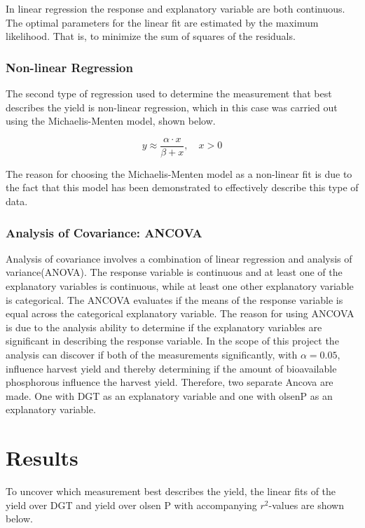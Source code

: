 \documentclass[11pt, fleqn, titlepage]{article}
\begin{document}
\noindent
In linear regression the response and explanatory variable are both continuous. The optimal parameters for the linear fit are estimated by the maximum likelihood. That is, to minimize the sum of squares of the residuals. \cite{statbog} 

\subsubsection*{Non-linear Regression}
The second type of regression used to determine the measurement that best describes the yield is non-linear regression, which in this case was carried out using the Michaelis-Menten model, shown below.

\[y \approx \frac{\alpha \cdot x}{\beta + x}, \quad x > 0 \]

The reason for choosing the Michaelis-Menten model as a non-linear fit is due to the fact that this model has been demonstrated to effectively describe this type of data. 

\subsubsection*{Analysis of Covariance: ANCOVA}
Analysis of covariance involves a combination of linear regression and analysis of variance(ANOVA). The response variable is continuous and at least one of the explanatory variables is continuous, while at least one other explanatory variable is categorical. The ANCOVA evaluates if the means of the response variable is equal across the categorical explanatory variable. The reason for using ANCOVA is due to the analysis ability to determine if the explanatory variables are significant in describing the response variable. In the scope of this project the analysis can discover if both of the measurements significantly, with $ \alpha = 0.05 $, influence harvest yield and thereby determining if the amount of bioavailable phosphorous influence the harvest yield. Therefore, two separate Ancova are made. One with DGT as an explanatory variable and one with olsenP as an explanatory variable.   \cite{statbog} 


\section{Results}

To uncover which measurement best describes the yield, the linear fits of the yield over DGT and yield over olsen P with accompanying $r^2$-values are shown below.
\end{document}
